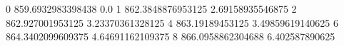 0 859.6932983398438 0.0
1 862.3848876953125 2.69158935546875
2 862.927001953125 3.23370361328125
4 863.19189453125 3.49859619140625
6 864.3402099609375 4.64691162109375
8 866.0958862304688 6.402587890625
